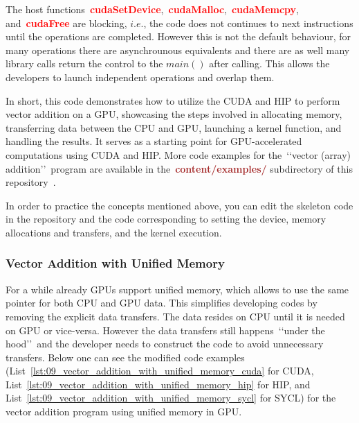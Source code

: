 \par
The host functions~\textbf{\textcolor{red}{cudaSetDevice}},~\textbf{\textcolor{red}{cudaMalloc}},~\textbf{\textcolor{red}{cudaMemcpy}}, and~\textbf{\textcolor{red}{cudaFree}} are blocking, $i.e.$, the code does not continues to next instructions until the operations are completed.
However this is not the default behaviour, for many operations there are asynchrounous equivalents and there are as well many library calls return the control to the $main()$ after calling. 
This allows the developers to launch independent operations and overlap them.


\par
In short, this code demonstrates how to utilize the CUDA and HIP to perform vector addition on a GPU, showcasing the steps involved in allocating memory, transferring data between the CPU and GPU, launching a kernel function, and handling the results.
It serves as a starting point for GPU-accelerated computations using CUDA and HIP.
More code examples for the~\lq\lq vector (array) addition\rq\rq~program are available in the~\textbf{\textcolor{brown}{content/examples/}} subdirectory of this repository~\cite{gpu-programming-examples}.


\par
In order to practice the concepts mentioned above, you can edit the skeleton code in the repository and the code corresponding to setting the device, memory allocations and transfers, and the kernel execution.


\subsubsection{Vector Addition with Unified Memory}


\par
For a while already GPUs support unified memory, which allows to use the same pointer for both CPU and GPU data.
This simplifies developing codes by removing the explicit data transfers.
The data resides on CPU until it is needed on GPU or vice-versa.
However the data transfers still happens~\lq\lq under the hood\rq\rq~and the developer needs to construct the code to avoid unnecessary transfers.
Below one can see the modified code examples (List~\ref{lst:09_vector_addition_with_unified_memory_cuda} for CUDA, List~\ref{lst:09_vector_addition_with_unified_memory_hip} for HIP, and List~\ref{lst:09_vector_addition_with_unified_memory_sycl} for SYCL) for the vector addition program using unified memory in GPU.


